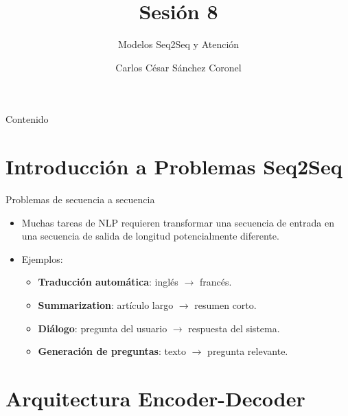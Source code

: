 \documentclass[aspectratio=169, 10pt, xcolor=table]{beamer}
\title[SESIÓN 8 NLP]{\textbf{Sesión 8}}
\subtitle{Modelos Seq2Seq y Atención}
\author[Prof. C. Sánchez]{Carlos César Sánchez Coronel}
\institute{\textbf{NLP}}
\date{}
\begin{document}
\begin{frame}
    \titlepage
\end{frame}

\begin{frame}{Contenido}
    \tableofcontents
\end{frame}

\section{Introducción a Problemas Seq2Seq}

\begin{frame}{Problemas de secuencia a secuencia}
    \begin{itemize}
        \item Muchas tareas de NLP requieren transformar una secuencia de entrada en una secuencia de salida de longitud potencialmente diferente.
        \item Ejemplos:
        \begin{itemize}
            \item \textbf{Traducción automática}: inglés $\rightarrow$ francés.
            \item \textbf{Summarization}: artículo largo $\rightarrow$ resumen corto.
            \item \textbf{Diálogo}: pregunta del usuario $\rightarrow$ respuesta del sistema.
            \item \textbf{Generación de preguntas}: texto $\rightarrow$ pregunta relevante.
        \end{itemize}
    \end{itemize}
\end{frame}

\section{Arquitectura Encoder-Decoder}
\end{document}
